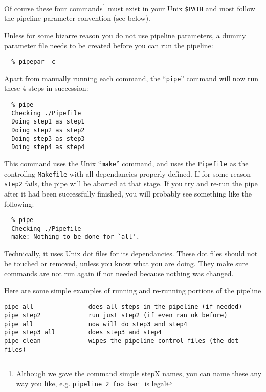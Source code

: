\documentclass[preprint]{aastex} %
\begin{document}
Of course these four commands\footnote{Although we gave
the command simple stepX names, you can name these any
way you like, e.g. {\tt pipeline 2 foo bar } is legal}
must exist in your Unix {\tt \$PATH} and
most follow the pipeline parameter convention (see below).

Unless for some bizarre reason you do not use pipeline
parameters, a dummy parameter file needs to be created
before you can run the pipeline:

\footnotesize
\begin{verbatim}
  % pipepar -c
\end{verbatim}
\normalsize   

Apart from manually running each command, the ``{\tt pipe}'' 
command will now run these 4 steps in succession:

\footnotesize
\begin{verbatim}
  % pipe
  Checking ./Pipefile
  Doing step1 as step1
  Doing step2 as step2
  Doing step3 as step3
  Doing step4 as step4
\end{verbatim}
\normalsize   

This command 
uses the Unix ``{\tt make}'' command, and uses the {\tt Pipefile}
as the controllng {\tt Makefile} with all dependancies properly defined.
If for some reason {\tt step2} fails, the pipe will be aborted at that stage. If
you try and re-run the pipe after it had been successfully
finished, you will probably see something like the following:

\footnotesize
\begin{verbatim}
  % pipe
  Checking ./Pipefile
  make: Nothing to be done for `all'.
\end{verbatim}
\normalsize   

Technically, it uses Unix dot files for its dependancies.
These dot files should not be touched or removed, unless you know what you are
doing. They make sure commands are not run again if not needed because
nothing was changed.

Here are some simple examples of running and re-running portions
of the pipeline

\footnotesize
\begin{verbatim}
pipe all               does all steps in the pipeline (if needed)
pipe step2             run just step2 (if even ran ok before)
pipe all               now will do step3 and step4
pipe step3 all         does step3 and step4
pipe clean             wipes the pipeline control files (the dot files)
\end{verbatim}
\normalsize
\end{document}
